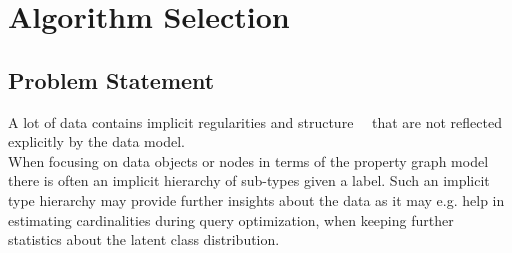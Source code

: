 \chapter{Algorithm Selection}\label{\positionnumber}
\section{Problem Statement}\label{\positionnumber}
A lot of data contains implicit regularities and structure~\cite{mitchell2006discipline}~\cite{carlsson2009topology} that are not reflected explicitly by the data model.\\
When focusing on data objects or nodes in terms of the property graph model there is often an implicit hierarchy of sub-types given a label. Such an implicit type hierarchy may provide further insights about the data as it may e.g. help in estimating cardinalities during query optimization, when keeping further statistics about the latent class distribution. \\


